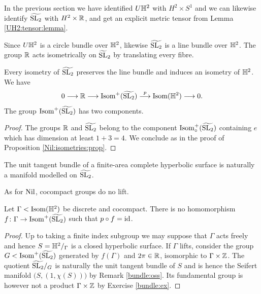 In the previous section we have identified $U\mathbb{H}^2$ with $H^2 \times S^1$ and we can likewise identify $\widetilde{{\rm SL}_2}$ with $H^2 \times \mathbb{R}$, and get an explicit metric tensor from Lemma \ref{UH2:tensor:lemma}.

Since $U\mathbb{H}^2$ is a circle bundle over $\mathbb{H}^2$, likewise $\widetilde{{\rm SL}_2}$ is a line bundle over $\mathbb{H}^2$. The group $\mathbb{R}$ acts isometrically on $\widetilde {{\rm SL}}_2$ by translating every fibre.

\begin{prop}
Every isometry of $\widetilde{{\rm SL}_2}$ preserves the line bundle and induces an isometry of $\mathbb{H}^2$. We have
$$0 \longrightarrow \mathbb{R} \longrightarrow {\rm Isom}^+(\widetilde{{\rm SL}_2}) \stackrel p\longrightarrow {\rm Isom}(\mathbb{H}^2) \longrightarrow 0.$$
The group ${\rm Isom}^+(\widetilde{{\rm SL}_2})$ has two components. 
\end{prop}
\begin{proof}
The groups $\mathbb{R}$ and $\widetilde{{\rm SL}_2}$ belong to the component ${\rm Isom}^+_\circ (\widetilde{{\rm SL}_2})$ containing $e$ which has dimension at least $1+3=4$. We conclude as in the proof of Proposition \ref{Nil:isometries:prop}.
\end{proof}

\begin{ex}
The unit tangent bundle of a finite-area complete hyperbolic surface is naturally a manifold modelled on $\widetilde{{\rm SL}_2}$.
\end{ex}

As for ${\rm Nil}$, cocompact groups do no lift.

\begin{prop} \label{SL2:no:lift:prop}
Let $\Gamma < {\rm Isom}(\mathbb{H}^2)$ be discrete and cocompact. There is no homomorphism $f\colon \Gamma \to {\rm Isom}^+(\widetilde{{\rm SL}_2})$ such that $p\circ f = {\rm id}$.
\end{prop}
\begin{proof}
Up to taking a finite index subgroup we may suppose that $\Gamma$ acts freely and hence $S=\mathbb{H}^2/_\Gamma$ is a closed hyperbolic surface. If $\Gamma$ lifts, consider the group $G< {\rm Isom}^+(\widetilde{{\rm SL}_2})$ generated by $f(\Gamma)$ and $2 \pi\in \mathbb{R}$, isomorphic to $\Gamma \times \mathbb{Z}$. The quotient $\widetilde{{\rm SL}_2}/_G$ is naturally the unit tangent bundle of $S$ and is hence the Seifert manifold $\big(S, (1, \chi(S))\big)$ by Remark \ref{bundle:oss}. Its fundamental group is however not a product $\Gamma \times \mathbb{Z}$ by Exercise \ref{bundle:ex}.
\end{proof}

